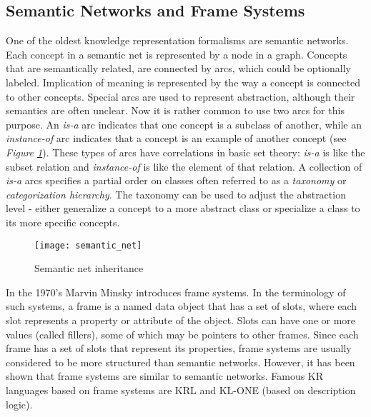 \subsection{Semantic Networks and Frame Systems}
One of the oldest knowledge representation formalisms are semantic networks. Each concept in a semantic net is represented by a node in a graph. Concepts that are
semantically related, are connected by arcs, which could be optionally labeled. Implication of meaning is represented by the way a concept is connected to other concepts. Special arcs are used to represent abstraction, although their semantics are often unclear. Now it is rather common to use two arcs for this purpose. An \textit{is-a} arc indicates that one concept is a subclass of another, while an \textit{instance-of} arc indicates that a concept is an example of another concept (see \textit{Figure \ref{fig:semantic_net}}). These types of arcs have correlations in basic set theory: \textit{is-a} is like the subset relation and \textit{instance-of} is like the element of that relation.
A collection of \textit{is-a} arcs specifies a partial order on classes often referred to as a \textit{taxonomy} or \textit{categorization hierarchy}. The taxonomy can be used to adjust the abstraction level - either generalize a concept to a more abstract class or specialize a class to its more specific concepts.

\begin{figure}[h!]
    \centering
    \texttt{[image: semantic\_net]}
    \caption{Semantic net inheritance}
    \label{fig:semantic_net}
\end{figure}

In the 1970's Marvin Minsky introduces frame systems. In the terminology of such systems, a frame is a named data object that has a set of slots, where each slot
represents a property or attribute of the object. Slots can have one or more values (called fillers), some of which may be pointers to other frames. Since each frame has a set of slots that represent its properties, frame systems are usually considered to be
more structured than semantic networks. However, it has been shown that frame systems are similar to semantic networks. Famous KR languages based on frame systems are KRL and KL-ONE (based on description logic). 

